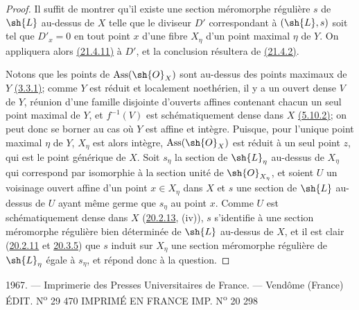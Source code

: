 \begin{proof}
Il suffit de montrer qu'il existe une section méromorphe régulière $s$
de $\sh{L}$ au-dessus de $X$ telle que le diviseur $D'$ correspondant
à $(\sh{L},s)$ soit tel que $D'_x=0$ en tout point $x$ d'une fibre
$X_\eta$ d'un point maximal $\eta$ de $Y$. On appliquera alors
{\hyperlink{ega4.c04.cor.21-4-11}{(21.4.11)}} à $D'$, et la conclusion
résultera de {\hyperlink{ega4.c04.def.21-4-2}{(21.4.2)}}.

Notons que les points de $\operatorname{Ass}(\sh{O}_X)$ sont au-dessus
des points maximaux de $Y$ {\hyperref[canon-index.ega4.c04.prop.3-3-1]{(3.3.1)}};
comme $Y$ est réduit et localement noethérien, il y a un ouvert dense
$V$ de $Y$, réunion d'une famille disjointe d'ouverts affines contenant
chacun un seul point maximal de $Y$, et $f^{-1}(V)$ est
schématiquement dense dans $X$
{\hyperref[canon-index.ega4.c04.prop.5-10-2]{(5.10.2)}}; on peut donc se borner au
cas où $Y$ est affine et intègre. Puisque, pour l'unique point maximal
$\eta$ de $Y$, $X_\eta$ est alors intègre,
$\operatorname{Ass}(\sh{O}_X)$ est réduit à un seul point $z$, qui est
le point générique de $X$. Soit $s_\eta$ la section de $\sh{L}_\eta$
au-dessus de $X_\eta$ qui correspond par isomorphie à la section unité
de $\sh{O}_{X_\eta}$, et soient $U$ un voisinage ouvert affine d'un
point $x\in X_\eta$ dans $X$ et $s$ une section de $\sh{L}$ au-dessus
de $U$ ayant même germe que $s_\eta$ au point $x$. Comme $U$ est
schématiquement dense dans $X$
({\hyperlink{ega4.c04.statement.20-2-13}{20.2.13}}, (iv)), $s$
s'identifie à une section méromorphe régulière bien déterminée de
$\sh{L}$ au-dessus de $X$, et il est clair
({\hyperlink{ega4.c04.prop.20-2-11}{20.2.11}} et
{\hyperlink{ega4.c04.prop.20-3-5}{20.3.5}}) que $s$ induit sur $X_\eta$
une section méromorphe régulière de $\sh{L}_\eta$ égale à $s_\eta$, et
répond donc à la question.
\end{proof}

\bigskip
\begin{center}
\small
1967. --- Imprimerie des Presses Universitaires de France. --- Vendôme
(France)\\
ÉDIT. N\textsuperscript{o} 29 470\qquad
IMPRIMÉ EN FRANCE\qquad
IMP. N\textsuperscript{o} 20 298
\end{center}

